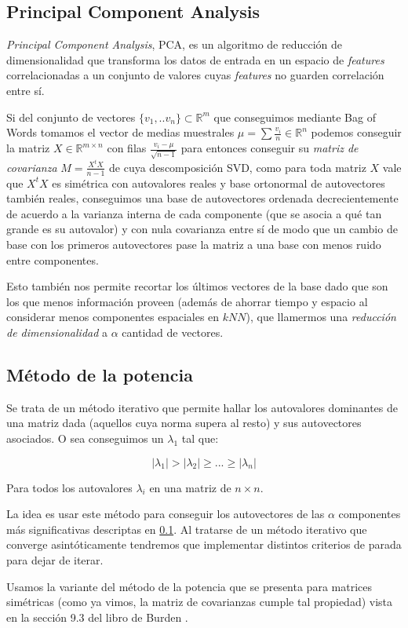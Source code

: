 
\subsection{Principal Component Analysis}%
\label{sub:principal_component_analysis}

\textit{Principal Component Analysis}, PCA, es un algoritmo de reducción de
dimensionalidad que transforma los datos de entrada en un espacio de
\textit{features} correlacionadas a un conjunto de valores cuyas
\textit{features} no guarden correlación entre sí.


Si del conjunto de vectores $\{v_1,..v_n \} \subset \mathds{R}^m$ que
conseguimos mediante Bag of Words tomamos el vector de medias
muestrales $\mu = \sum \frac{v_i}{n} \in \mathds{R}^n $ podemos
conseguir la matriz $X \in \mathds{R}^{m\times n}$ con filas
$\frac{v_i-\mu}{\sqrt{n-1}}$ para entonces conseguir su \textit{matriz de
  covarianza} $M=\frac{X^t X}{n-1}$ de cuya descomposición SVD, como
para toda matriz $X$ vale que $X^t X$ es simétrica con autovalores
reales y base ortonormal de autovectores también reales, conseguimos
una base de autovectores ordenada decrecientemente de acuerdo a la
varianza interna de cada componente (que se asocia a qué tan grande es
su autovalor) y con nula covarianza entre sí de modo que un cambio de
base con los primeros autovectores pase la matriz a una base con menos
ruido entre componentes.

Esto también nos permite recortar los últimos vectores de la base dado
que son los que menos información proveen (además de ahorrar tiempo y
espacio al considerar menos componentes espaciales en $kNN$), que
llamermos una \textit{reducción de dimensionalidad} a $\alpha$
cantidad de vectores.

\subsection{Método de la potencia}%
\label{sub:pm}
Se trata de un método iterativo que permite hallar los autovalores dominantes de
una matriz dada (aquellos cuya norma supera al resto) y sus autovectores
asociados. O sea conseguimos un $\lambda_1$ tal que:

$$ |\lambda_1| > |\lambda_2| \geq ... \geq |\lambda_n| $$

Para todos los autovalores $\lambda_i$ en una matriz de $n\times n$.

La idea es usar este método para conseguir los autovectores de las $\alpha$
componentes más significativas descriptas en \ref{sub:principal_component_analysis}. Al tratarse
de un método iterativo que converge asintóticamente tendremos que implementar distintos criterios de parada para dejar de iterar.

Usamos la variante del método de la potencia que se presenta para matrices simétricas (como ya vimos, la matriz de covarianzas cumple tal propiedad) vista en la sección 9.3 del libro de Burden \cite{Burden}.
